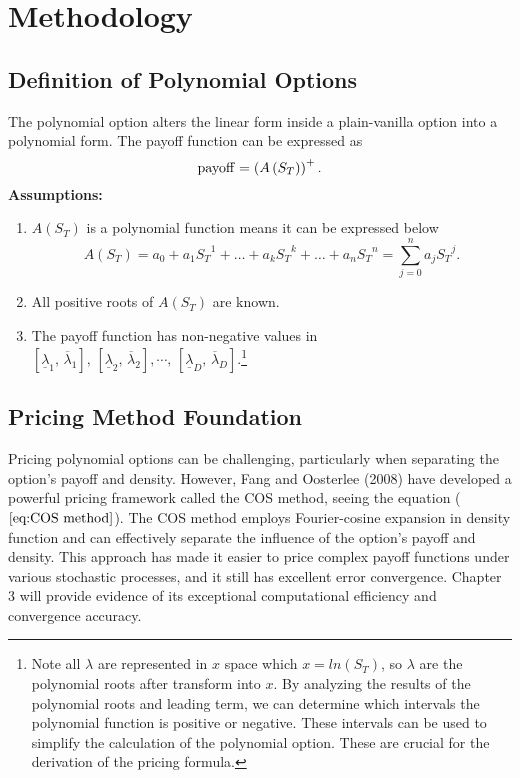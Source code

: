 
\chapter{Methodology}

\section{Definition of Polynomial Options}
The polynomial option alters the linear form inside a plain-vanilla option into a polynomial form. The payoff function can be expressed as
$$
    {\rm payoff} = \left(A\left(S_T\right)\right)^+.
$$
\textbf{Assumptions:}
\begin{enumerate}
    \item $A\left(S_T\right)$ is a polynomial function means it can be expressed below
    $$
    A\left(S_T\right)=a_0+a_1{S_T}^1+\ldots+a_k{S_T}^k+\ldots+a_n{S_T}^n=\sum_{j=0}^{n}a_j {S_T}^{j}.
    $$
    \item All positive roots of $A\left(S_T\right)$ are known.
    \item The payoff function has non-negative values in $\left[\underline{\lambda}_1,\,\overline{\lambda}_1\right],\,\left[\underline{\lambda}_2,\,\overline{\lambda}_2\right],\cdots,\,\left[\underline{\lambda}_D,\,\overline{\lambda}_D\right]$.\footnote{Note all $\lambda$ are represented in $x$ space which $x = ln\left(S_T\right)$, so $\lambda$ are the polynomial roots after transform into $x$. By analyzing the results of the polynomial roots and leading term, we can determine which intervals the polynomial function is positive or negative. These intervals can be used to simplify the calculation of the polynomial option. These are crucial for the derivation of the pricing formula.}
\end{enumerate}


\section{Pricing Method Foundation}
Pricing polynomial options can be challenging, particularly when separating the option's payoff and density. However, Fang and Oosterlee (2008) have developed a powerful pricing framework called the COS method, seeing the equation ($\ref{eq:COS method}$). The COS method employs Fourier-cosine expansion in density function and can effectively separate the influence of the option's payoff and density. This approach has made it easier to price complex payoff functions under various stochastic processes, and it still has excellent error convergence. Chapter 3 will provide evidence of its exceptional computational efficiency and convergence accuracy.\\

